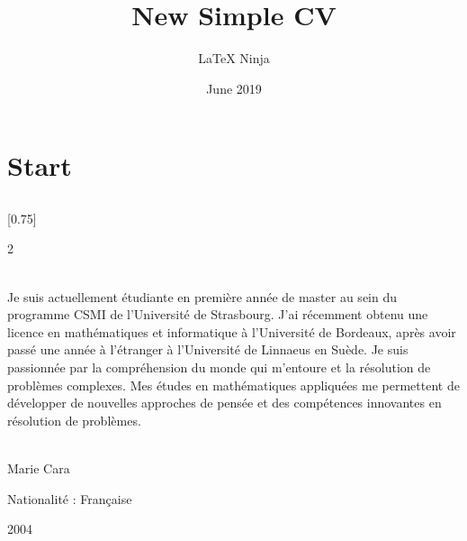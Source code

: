 \documentclass[lighthipster]{simplehipstercv}
\title{New Simple CV}
\author{\LaTeX{} Ninja}
\date{June 2019}
\begin{document}
\thispagestyle{empty}

\section*{Start}



\subsection*{}
\vspace{4em}

\setlength{\columnsep}{1.5cm}
[0.75]
\begin{paracol}{2}

\paracolbackgroundoptions

\footnotesize
{\setasidefontcolour
\flushright

\begin{center}
\end{center}

\begin{center}

\\[0.5em]

{\footnotesize
Je suis actuellement étudiante en première année de master au sein du programme CSMI de l'Université de Strasbourg.
J'ai récemment obtenu une licence en mathématiques et informatique à l'Université de Bordeaux, après avoir passé une année à l'étranger à l'Université de Linnaeus en Suède.
Je suis passionnée par la compréhension du monde qui m'entoure et la résolution de problèmes complexes. Mes études en mathématiques appliquées me permettent de développer de nouvelles approches de pensée et des compétences innovantes en résolution de problèmes.
}

\bigskip

 \\[0.5em]

Marie Cara

Nationalité : Française

2004

\bigskip

 \\[0.5em]


\end{center}}
\end{paracol}
\end{document}
